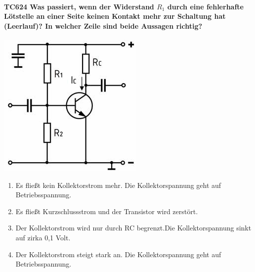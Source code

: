 \documentclass[8pt]{article}
\begin{document}
\begin{enumerate}
\begin{enumerate}[nolistsep,label=\Alph*]
{\begin{enumerate}[nolistsep,label=\Alph*]
\paragraph*{TC624 Was passiert, wenn der Widerstand $R_{1}$ durch eine fehlerhafte Lötstelle an einer Seite keinen Kontakt mehr zur Schaltung hat (Leerlauf)? In welcher Zeile sind beide Aussagen richtig?}
\begin{center}
	\begin{minipage}{\linewidth}
		\centering
		\includegraphics[scale=1.0]{pics/tc624_a.jpg}
	\end{minipage}
\end{center}
\begin{enumerate}[nolistsep,label=\Alph*]
\item Es fließt kein Kollektorstrom mehr. Die Kollektorspannung geht auf Betriebsspannung.
\item Es fließt Kurzschlussstrom und der Transistor wird zerstört.
\item Der Kollektorstrom wird nur durch RC begrenzt.Die Kollektorspannung sinkt auf zirka 0,1 Volt.
\item Der Kollektorstrom steigt stark an. Die Kollektorspannung geht auf Betriebsspannung.
\end{enumerate}


\end{enumerate}}
\end{enumerate}
\end{enumerate}
\end{document}
